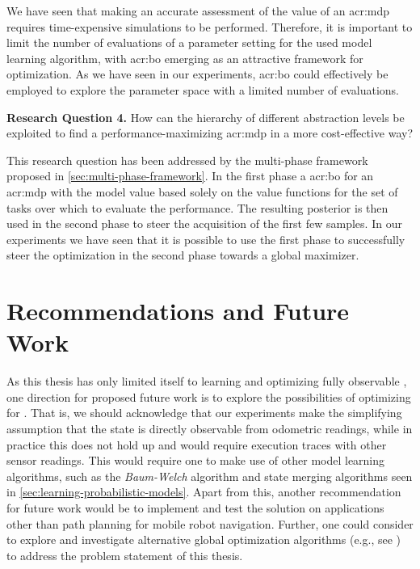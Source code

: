 We have seen that making an accurate assessment of the value of an \acrshort{acr:mdp} requires time-expensive simulations to be performed.
Therefore, it is important to limit the number of evaluations of a parameter setting for the used model learning algorithm, with \acrshort{acr:bo} emerging as an attractive framework for optimization.
As we have seen in our experiments, \acrshort{acr:bo} could effectively be employed to explore the parameter space with a limited number of evaluations.

\vspace{16pt}
\noindent%
\textbf{Research Question 4.} How can the hierarchy of different abstraction levels be exploited to find a performance-maximizing \acrshort{acr:mdp} in a more cost-effective way?
\vspace{12pt}

This research question has been addressed by the multi-phase framework proposed in \autoref{sec:multi-phase-framework}.
In the first phase a \acrshort{acr:bo} for an \acrshort{acr:mdp} with the model value based solely on the value functions for the set of tasks over which to evaluate the performance.
The resulting posterior is then used in the second phase to steer the acquisition of the first few samples.
In our experiments we have seen that it is possible to use the first phase to successfully steer the optimization in the second phase towards a global maximizer.


\section{Recommendations and Future Work}
\label{sec:recommendations-future-work}

As this thesis has only limited itself to learning and optimizing fully observable , one direction for proposed future work is to explore the possibilities of optimizing for .
That is, we should acknowledge that our experiments make the simplifying assumption that the state is directly observable from odometric readings, while in practice this does not hold up and would require execution traces with other sensor readings.
This would require one to make use of other model learning algorithms, such as the \textit{Baum-Welch} algorithm and state merging algorithms seen in \autoref{sec:learning-probabilistic-models}.
Apart from this, another recommendation for future work would be to implement and test the solution on applications other than path planning for mobile robot navigation.
Further, one could consider to explore and investigate alternative global optimization algorithms (e.g., see \cite{bergstra2011algorithms}) to address the problem statement of this thesis.

\vspace{12pt}
\noindent{}


%